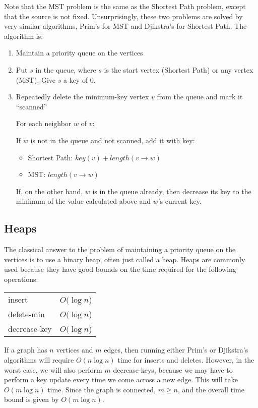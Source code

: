 \documentclass{article}
\begin{document}
Note that the MST problem is the same as the Shortest Path problem,
except that the source is not fixed. Unsurprisingly, these two problems
are solved by very similar algorithms, Prim's for MST and Djikstra's for
Shortest Path. The algorithm is:

\begin{enumerate}
\item Maintain a priority queue on the vertices
\item Put $s$ in the queue, where $s$ is the start vertex (Shortest
Path) or any vertex (MST). Give $s$ a key of 0.
\item Repeatedly delete the minimum-key vertex $v$ from the queue and
mark it ``scanned''

   For each neighbor $w$ of $v$:

        If $w$ is not in the queue and not scanned, add it with key:
        \begin{itemize}
                \item Shortest Path:  $key(v) + length(v \rightarrow w)$
                \item MST:  $length(v \rightarrow w)$
        \end{itemize}

        If, on the other hand, $w$ is in the queue already, then
        decrease its key to the minimum of the value calculated above
        and $w$'s current key.

\end{enumerate}

\subsection{Heaps}

The classical answer to the problem of maintaining a priority queue on
the vertices is to use a binary heap, often just called a heap.
Heaps are commonly used because
they have good bounds on the time required for the following
operations:

\begin{tabular}{|l|l|}
\hline
insert & $O(\log n$) \\
delete-min & $O(\log n$) \\
decrease-key & $O(\log n$) \\
\hline
\end{tabular}

If a graph has $n$ vertices and $m$ edges, then running either Prim's or
Djikstra's algorithms will require $O(n \log n)$ time for inserts and
deletes.  However, in the worst case,
we will also perform $m$ decrease-keys, because we may have to perform
a key update every time we come across a new edge.
This will take $O(m \log n)$
time.  Since the graph is connected, $m \geq n$, and the overall time
bound is given by $O(m \log n)$.
\end{document}
